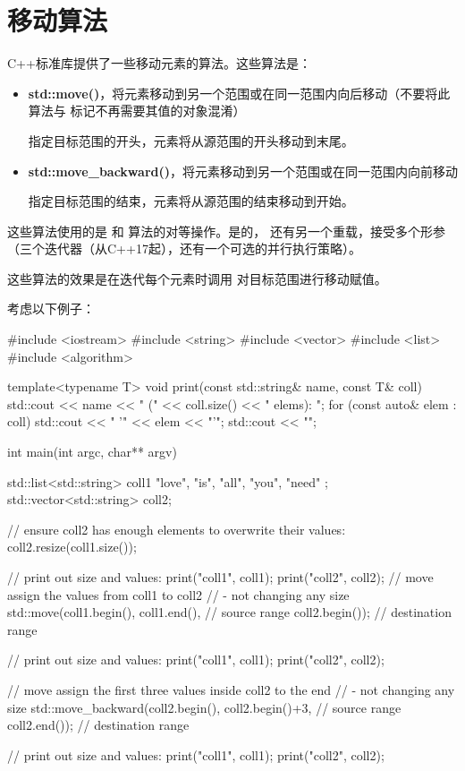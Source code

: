 \section{移动算法}
C++标准库提供了一些移动元素的算法。这些算法是：

\begin{itemize}
	\item \textbf{std::move()}，将元素移动到另一个范围或在同一范围内向后移动（不要将此算法与  标记不再需要其值的对象混淆）

	指定目标范围的开头，元素将从源范围的开头移动到末尾。
	\item \textbf{std::move_backward()}，将元素移动到另一个范围或在同一范围内向前移动

	指定目标范围的结束，元素将从源范围的结束移动到开始。
\end{itemize}

这些算法使用的是  和  算法的对等操作。是的， 还有另一个重载，接受多个形参（三个迭代器（从C++17起），还有一个可选的并行执行策略）。

这些算法的效果是在迭代每个元素时调用  对目标范围进行移动赋值。

考虑以下例子：

\begin{cppcode}
#include <iostream>
#include <string>
#include <vector>
#include <list>
#include <algorithm>

template<typename T>
void print(const std::string& name, const T& coll)
{
	std::cout << name << " (" << coll.size() << " elems): ";
	for (const auto& elem : coll) {
		std::cout << " '" << elem << "'";
	}
	std::cout << "\n";
}

int main(int argc, char** argv)
{
	std::list<std::string> coll1 { "love", "is", "all", "you", "need" };
	std::vector<std::string> coll2;

	// ensure coll2 has enough elements to overwrite their values:
	coll2.resize(coll1.size());

	// print out size and values:
	print("coll1", coll1);
	print("coll2", coll2);
	// move assign the values from coll1 to coll2
	// - not changing any size
	std::move(coll1.begin(), coll1.end(), // source range
	coll2.begin()); // destination range

	// print out size and values:
	print("coll1", coll1);
	print("coll2", coll2);

	// move assign the first three values inside coll2 to the end
	// - not changing any size
	std::move_backward(coll2.begin(), coll2.begin()+3, // source range
	coll2.end()); // destination range

	// print out size and values:
	print("coll1", coll1);
	print("coll2", coll2);
}
\end{cppcode}

